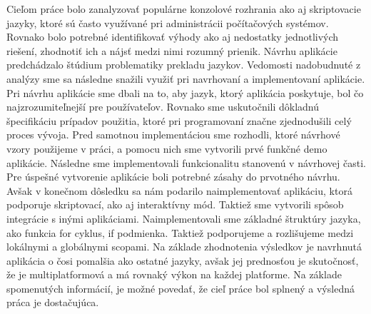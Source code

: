 \indent Cieľom práce bolo zanalyzovať populárne konzolové rozhrania ako aj skriptovacie jazyky, ktoré sú často využívané pri administrácii počítačových systémov. Rovnako bolo potrebné identifikovať výhody ako aj nedostatky jednotlivých riešení, zhodnotiť ich a nájsť medzi nimi rozumný prienik. 
\newline
\indent Návrhu aplikácie predchádzalo štúdium problematiky prekladu jazykov. Vedomosti nadobudnuté z analýzy sme sa následne snažili využiť pri navrhovaní a implementovaní aplikácie. 
\newline
\indent Pri návrhu aplikácie sme dbali na to, aby jazyk, ktorý aplikácia poskytuje, bol čo najzrozumiteľnejší pre používateľov. Rovnako sme uskutočnili dôkladnú špecifikáciu prípadov použitia, ktoré pri programovaní značne zjednodušili celý proces vývoja. Pred samotnou implementáciou sme rozhodli, ktoré návrhové vzory použijeme v práci, a pomocu nich sme vytvorili prvé funkčné demo aplikácie. 
\newline
\indent Následne sme implementovali funkcionalitu stanovenú v návrhovej časti. Pre úspešné vytvorenie aplikácie boli potrebné zásahy do prvotného návrhu. Avšak v konečnom dôsledku sa nám podarilo naimplementovať aplikáciu, ktorá podporuje skriptovací, ako aj interaktívny mód. Taktiež sme vytvorili spôsob integrácie s inými aplikáciami. Naimplementovali sme základné štruktúry jazyka, ako funkcia for cyklus, if podmienka. Taktiež podporujeme a rozlišujeme medzi lokálnymi a globálnymi scopami. Na základe zhodnotenia výsledkov je navrhnutá aplikácia o čosi pomalšia ako ostatné jazyky, avšak jej prednosťou je skutočnosť, že je multiplatformová a má rovnaký výkon na každej platforme.
\newline
\indent Na základe spomenutých informácií, je možné povedať, že cieľ práce bol splnený a výsledná práca je dostačujúca.